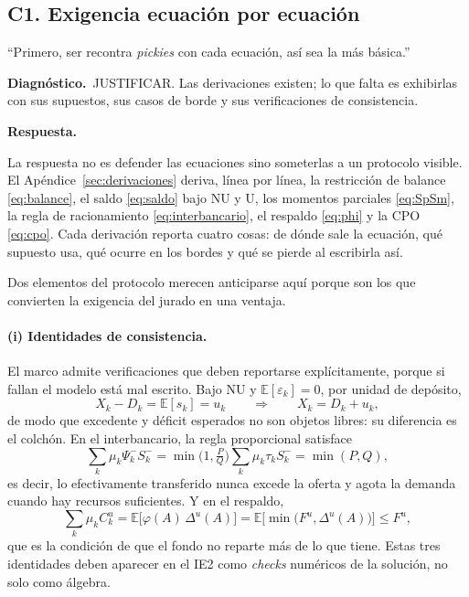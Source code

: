 \documentclass[11pt]{article}
\newcommand{\diag}[1]{\par\noindent\textbf{Diagn\'ostico.}\ #1\par}
\newcommand{\resp}{\par\noindent\textbf{Respuesta.}\par}
\newcommand{\E}{\mathbb{E}}
\theoremstyle{definition}
\begin{document}
\subsection{C1. Exigencia ecuaci\'on por ecuaci\'on}\label{sub:C1}

\begin{jurado}
``Primero, ser recontra \emph{pickies} con cada ecuaci\'on, as\'i sea la m\'as
b\'asica.''
\end{jurado}

\diag{JUSTIFICAR. Las derivaciones existen; lo que falta es exhibirlas con sus
supuestos, sus casos de borde y sus verificaciones de consistencia.}

\resp
La respuesta no es defender las ecuaciones sino someterlas a un protocolo
visible. El Ap\'endice~\ref{sec:derivaciones} deriva, l\'inea por l\'inea, la
restricci\'on de balance \eqref{eq:balance}, el saldo \eqref{eq:saldo} bajo NU y
U, los momentos parciales \eqref{eq:SpSm}, la regla de racionamiento
\eqref{eq:interbancario}, el respaldo \eqref{eq:phi} y la CPO
\eqref{eq:cpo}. Cada derivaci\'on reporta cuatro cosas: de d\'onde sale la
ecuaci\'on, qu\'e supuesto usa, qu\'e ocurre en los bordes y qu\'e se pierde al
escribirla as\'i.

Dos elementos del protocolo merecen anticiparse aqu\'i porque son los que
convierten la exigencia del jurado en una ventaja.

\paragraph{(i) Identidades de consistencia.} El marco admite verificaciones que
deben reportarse expl\'icitamente, porque si fallan el modelo est\'a mal escrito.
Bajo NU y $\E[\varepsilon_k]=0$, por unidad de dep\'osito,
\begin{equation}
X_k - D_k = \E[s_k] = u_k
\qquad\Longrightarrow\qquad X_k = D_k + u_k,
\label{eq:identidad1}
\end{equation}
de modo que excedente y d\'eficit esperados no son objetos libres: su diferencia
es el colch\'on. En el interbancario, la regla proporcional satisface
\begin{equation}
\sum_k \mu_k \Psi^-_k S^-_k
= \min\!\Big(1,\tfrac{P}{Q}\Big)\sum_k\mu_k\tau_k S^-_k
= \min(P,Q),
\label{eq:identidad2}
\end{equation}
es decir, lo efectivamente transferido nunca excede la oferta y agota la
demanda cuando hay recursos suficientes. Y en el respaldo,
\begin{equation}
\sum_k\mu_k C^u_k=\E\big[\varphi(A)\,\Delta^u(A)\big]
=\E\big[\min\big(F^u,\Delta^u(A)\big)\big]\le F^u,
\label{eq:identidad3}
\end{equation}
que es la condici\'on de que el fondo no reparte m\'as de lo que tiene. Estas
tres identidades deben aparecer en el IE2 como \emph{checks} num\'ericos de la
soluci\'on, no solo como \'algebra.
\end{document}
